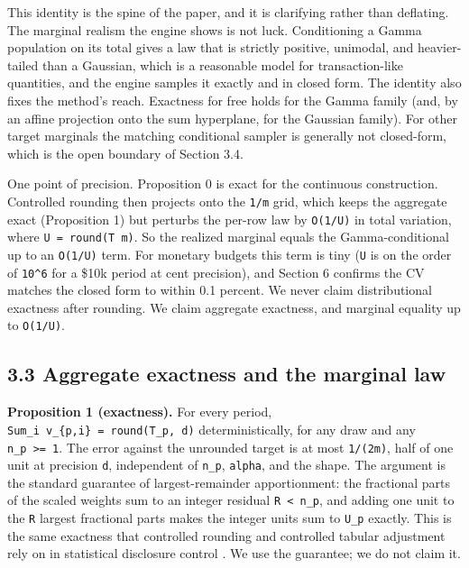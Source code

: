 This identity is the spine of the paper, and it is clarifying rather
than deflating. The marginal realism the engine shows is not luck.
Conditioning a Gamma population on its total gives a law that is
strictly positive, unimodal, and heavier-tailed than a Gaussian, which
is a reasonable model for transaction-like quantities, and the engine
samples it exactly and in closed form. The identity also fixes the
method's reach. Exactness for free holds for the Gamma family (and, by
an affine projection onto the sum hyperplane, for the Gaussian family).
For other target marginals the matching conditional sampler is generally
not closed-form, which is the open boundary of Section 3.4.

One point of precision. Proposition 0 is exact for the continuous
construction. Controlled rounding then projects onto the \texttt{1/\allowbreak{}m}
grid, which keeps the aggregate exact (Proposition 1) but perturbs the
per-row law by \texttt{O(1/\allowbreak{}U)} in total variation, where
\texttt{U\ =\ round(T\ m)}. So the realized marginal equals the
Gamma-conditional up to an \texttt{O(1/\allowbreak{}U)} term. For monetary budgets
this term is tiny (\texttt{U} is on the order of \texttt{10\^{}6} for a
\$10k period at cent precision), and Section 6 confirms the CV matches
the closed form to within 0.1 percent. We never claim distributional
exactness after rounding. We claim aggregate exactness, and marginal
equality up to \texttt{O(1/\allowbreak{}U)}.

\hypertarget{aggregate-exactness-and-the-marginal-law}{%
\subsection{3.3 Aggregate exactness and the marginal
law}\label{aggregate-exactness-and-the-marginal-law}}

\textbf{Proposition 1 (exactness).} For every period,
\texttt{Sum\_\allowbreak{}i\ v\_\allowbreak{}\{p,i\}\ =\ round(T\_\allowbreak{}p,\ d)} deterministically, for
any draw and any \texttt{n\_\allowbreak{}p\ \textgreater{}=\ 1}. The error against
the unrounded target is at most \texttt{1/\allowbreak{}(2m)}, half of one unit at
precision \texttt{d}, independent of \texttt{n\_\allowbreak{}p}, \texttt{alpha}, and
the shape. The argument is the standard guarantee of largest-remainder
apportionment: the fractional parts of the scaled weights sum to an
integer residual \texttt{R\ \textless{}\ n\_\allowbreak{}p}, and adding one unit to
the \texttt{R} largest fractional parts makes the integer units sum to
\texttt{U\_\allowbreak{}p} exactly. This is the same exactness that controlled
rounding and controlled tabular adjustment rely on in statistical
disclosure control \cite{cox1987rounding}. We use the guarantee; we do
not claim it.

